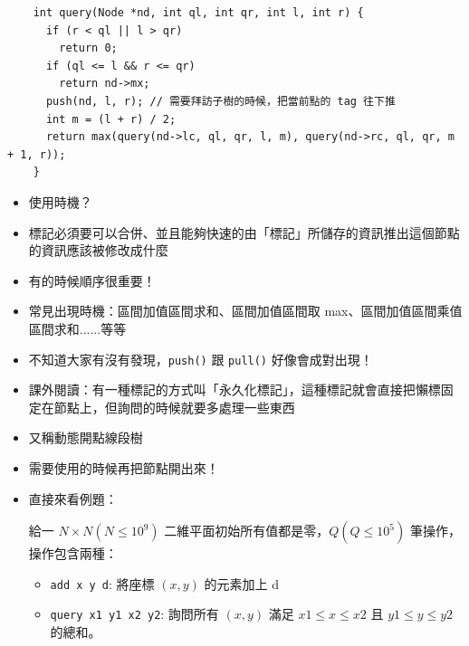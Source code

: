 \documentclass[standalone]{beamer}
\begin{document}
\begin{frame}[fragile]{}
  \begin{verbatim}
    int query(Node *nd, int ql, int qr, int l, int r) {
      if (r < ql || l > qr)
        return 0;
      if (ql <= l && r <= qr)
        return nd->mx;
      push(nd, l, r); // 需要拜訪子樹的時候，把當前點的 tag 往下推
      int m = (l + r) / 2;
      return max(query(nd->lc, ql, qr, l, m), query(nd->rc, ql, qr, m + 1, r));
    }
  \end{verbatim}
\end{frame}

\begin{frame}[fragile]{}
  \begin{itemize}
    \item 使用時機？
    \item 標記必須要可以合併、並且能夠快速的由「標記」所儲存的資訊推出這個節點的資訊應該被修改成什麼
    \item 有的時候順序很重要！
    \item 常見出現時機：區間加值區間求和、區間加值區間取 max、區間加值區間乘值區間求和......等等
    \item 不知道大家有沒有發現，\texttt{push()} 跟 \texttt{pull()} 好像會成對出現！
    \item 課外閱讀：有一種標記的方式叫「永久化標記」，這種標記就會直接把懶標固定在節點上，但詢問的時候就要多處理一些東西
  \end{itemize}
\end{frame}

\begin{frame}[fragile]{}
  \begin{itemize}
    \item 又稱動態開點線段樹
    \item 需要使用的時候再把節點開出來！
    \item 直接來看例題：
    \begin{problem}[二維區間求和]
      給一 $N \times N(N \leq 10^9)$ 二維平面初始所有值都是零，$Q(Q \leq 10^5)$ 筆操作，操作包含兩種：
      \begin{itemize}
        \item \texttt{add x y d}: 將座標 $(x,y)$ 的元素加上 d
        \item \texttt{query x1 y1 x2 y2}: 詢問所有 $(x,y)$ 滿足 $x1 \leq x \leq x2$ 且 $y1 \leq y \leq y2$ 的總和。
      \end{itemize}
    \end{problem}
  \end{itemize}
\end{frame}
\end{document}
